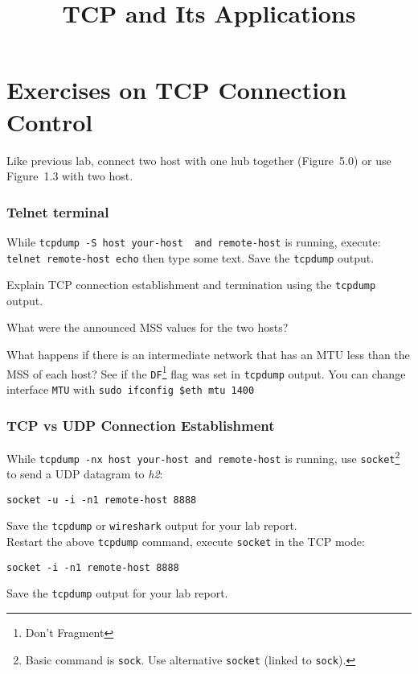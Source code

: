 \documentclass{../UTNetLab}
\title{TCP and Its Applications}
\begin{document}
\part{Exercises on TCP Connection Control}
    Like previous lab, connect two host with one hub together (Figure~5.0) or use Figure~1.3 with two host.

\section{Telnet terminal}
    While \lstinline[emph={your-host, remote-host}]{tcpdump -S host your-host  and remote-host} is running, execute: \lstinline[emph={your-host, remote-host}]{telnet remote-host echo} then type some text.
    Save the \lstinline{tcpdump} output.
    
    \begin{report}
        \item Explain TCP connection establishment and termination using the \lstinline{tcpdump} output.
        
        \item What were the announced MSS values for the two hosts?
        
        \item What happens if there is an intermediate network that has an MTU less than the MSS of each host?
    See if the \texttt{DF}\footnote{Don't Fragment} flag was set in \lstinline{tcpdump} output.
    You can change interface \texttt{MTU} with \lstinline[emph=$eth]{sudo ifconfig $eth mtu 1400}
    \end{report}
    
\section{TCP vs UDP Connection Establishment}
    While \lstinline[emph={your-host, remote-host}]{tcpdump -nx host your-host and remote-host} is running, use \lstinline{socket}\footnote{Basic command is \lstinline{sock}. Use alternative \lstinline{socket} (linked to \lstinline{sock}).} to send a UDP datagram to \textit{h2}:
    \begin{lstlisting}[emph={your-host, remote-host}]
socket -u -i -n1 remote-host 8888
    \end{lstlisting}
    {Save} the \lstinline{tcpdump} or \lstinline{wireshark} output for your lab report. \\
    Restart the above \lstinline{tcpdump} command, execute \lstinline{socket} in the TCP mode:
    \begin{lstlisting}[emph={remote-host}]
socket -i -n1 remote-host 8888
    \end{lstlisting}
    {Save} the \lstinline{tcpdump} output for your lab report.
    
\end{document}
